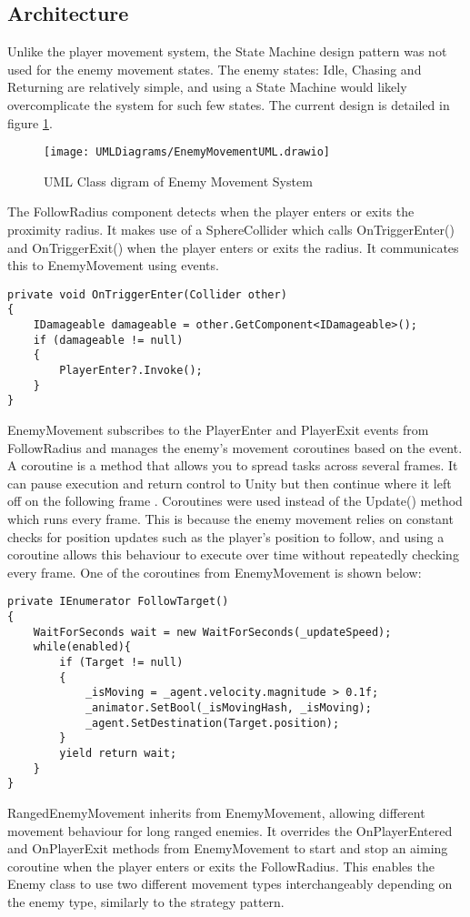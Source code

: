 \documentclass[10pt]{final_report}
\begin{document}
\subsection{Architecture}
Unlike the player movement system, the State Machine design pattern was not used for the enemy movement states. The enemy states: Idle, Chasing and Returning are relatively simple, and using a State Machine would likely overcomplicate the system for such few states. The current design is detailed in figure \ref{fig:label_enemyMovement}.
\begin{figure}[H]
    \centering
    \texttt{[image: UMLDiagrams/EnemyMovementUML.drawio]}
    \caption{UML Class digram of Enemy Movement System}
    \label{fig:label_enemyMovement}
\end{figure}
The FollowRadius component detects when the player enters or exits the proximity radius. It makes use of a SphereCollider which calls OnTriggerEnter() and OnTriggerExit() when the player enters or exits the radius. It communicates this to EnemyMovement using events. 
\begin{verbatim}
private void OnTriggerEnter(Collider other) 
{
    IDamageable damageable = other.GetComponent<IDamageable>();
    if (damageable != null)
    {
        PlayerEnter?.Invoke();
    }
}
\end{verbatim}
EnemyMovement subscribes to the PlayerEnter and PlayerExit events from FollowRadius and manages the enemy's movement coroutines based on the event. A coroutine is a method that allows you to spread tasks across several frames. It can pause execution and return control to Unity but then continue where it left off on the following frame \cite{unity2024_Coroutines}. Coroutines were used instead of the Update() method which runs every frame. This is because the enemy movement relies on constant checks for position updates such as the player's position to follow, and using a coroutine allows this behaviour to execute over time without repeatedly checking every frame. One of the coroutines from EnemyMovement is shown below:
\begin{verbatim}
private IEnumerator FollowTarget()
{
    WaitForSeconds wait = new WaitForSeconds(_updateSpeed);
    while(enabled){
        if (Target != null)
        {
            _isMoving = _agent.velocity.magnitude > 0.1f;
            _animator.SetBool(_isMovingHash, _isMoving);
            _agent.SetDestination(Target.position); 
        }
        yield return wait;
    }
}
\end{verbatim}
RangedEnemyMovement inherits from EnemyMovement, allowing different movement behaviour for long ranged enemies. It overrides the OnPlayerEntered and OnPlayerExit methods from EnemyMovement to start and stop an aiming coroutine when the player enters or exits the FollowRadius. This enables the Enemy class to use two different movement types interchangeably depending on the enemy type, similarly to the strategy pattern.
\end{document}
